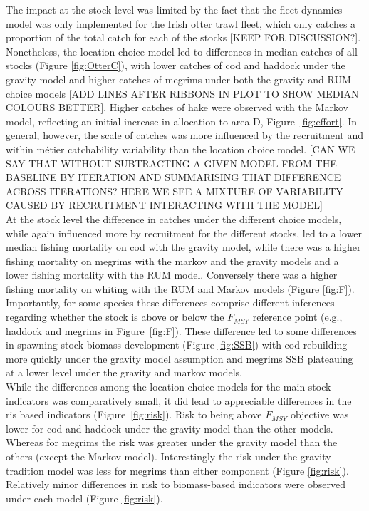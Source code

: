 \documentclass[12pt, halfline, a4paper]{ouparticle}
\begin{document}
The impact at the stock level was limited by the fact that the fleet dynamics
model was only implemented for the Irish otter trawl fleet, which only catches
a proportion of the total catch for each of the stocks [KEEP FOR DISCUSSION?]. Nonetheless, the
location choice model led to differences in median catches of all stocks
(Figure \ref{fig:OtterC}), with lower catches of cod and haddock under the
gravity model and higher catches of megrims under both the gravity and RUM
choice models [ADD LINES AFTER RIBBONS IN PLOT TO SHOW MEDIAN COLOURS BETTER]. Higher catches of hake were observed with the Markov
model, reflecting an initial increase in allocation to area D, Figure~\ref{fig:effort}. In general, however, the scale of catches was more influenced by the recruitment and within métier catchability variability than the location choice
model. [CAN WE SAY THAT WITHOUT SUBTRACTING A GIVEN MODEL FROM THE BASELINE BY ITERATION AND SUMMARISING THAT DIFFERENCE ACROSS ITERATIONS? HERE WE SEE A MIXTURE OF VARIABILITY CAUSED BY RECRUITMENT INTERACTING WITH THE MODEL]\\

At the stock level the difference in catches under the different choice models,
while again influenced more by recruitment for the different stocks, led to a
lower median fishing mortality on cod with the gravity model, while there was a
higher fishing mortality on megrims with the markov and the gravity models and
a lower fishing mortality with the RUM model. Conversely there was a higher
fishing mortality on whiting with the RUM and Markov models (Figure
\ref{fig:F}). Importantly, for some species these differences comprise different inferences regarding whether the stock is above or below the $F_{MSY}$ reference point (e.g., haddock and megrims in Figure~\ref{fig:F}). These difference led to some differences in spawning stock
biomass development (Figure \ref{fig:SSB}) with cod rebuilding more quickly
under the gravity model assumption and megrims SSB plateauing at a lower level
under the gravity and markov models. \\

While the differences among the location choice models for the main stock
indicators was comparatively small, it did lead to appreciable differences in the ris based indicators (Figure~\ref{fig:risk}). Risk to being above $F_{MSY}$ objective was lower for cod and haddock under the gravity model than the other models. Whereas for megrims the risk was greater under the gravity model than the others (except the Markov model). Interestingly the risk under the gravity-tradition model was less for megrims than either component (Figure \ref{fig:risk}). Relatively minor differences in risk to biomass-based indicators were observed under each model (Figure \ref{fig:risk}). 
\end{document}
